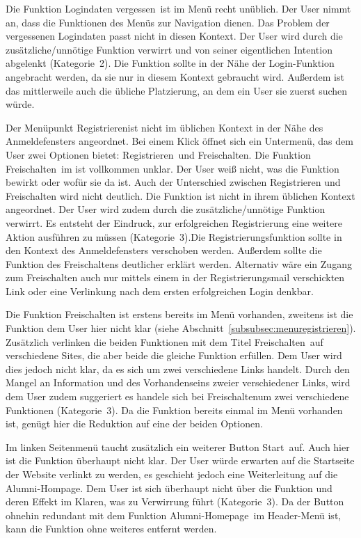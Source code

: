 {Die Funktion \glqq Logindaten vergessen\grqq~ist im Menü recht unüblich. Der User nimmt an, dass die Funktionen des Menüs zur Navigation dienen. Das Problem der vergessenen Logindaten passt nicht in diesen Kontext.
}
{Der User wird durch die zusätzliche/unnötige Funktion verwirrt und von seiner eigentlichen Intention abgelenkt (Kategorie~2).
}
{Die Funktion sollte in der Nähe der Login-Funktion angebracht werden, da sie nur in diesem Kontext gebraucht wird. Außerdem ist das mittlerweile auch die übliche Platzierung, an dem ein User sie zuerst suchen würde.
}

{Der Menüpunkt \glqq Registrieren\grqq ist nicht im üblichen Kontext in der Nähe des Anmeldefensters angeordnet. Bei einem Klick öffnet sich ein Untermenü, das dem User zwei Optionen bietet: \glqq Registrieren\grqq~und \glqq Freischalten\grqq.
Die Funktion \glqq Freischalten\grqq~im ist vollkommen unklar. Der User weiß nicht, was die Funktion bewirkt oder wofür sie da ist. Auch der Unterschied zwischen Registrieren und Freischalten wird nicht deutlich.
}{Die Funktion ist nicht in ihrem üblichen Kontext angeordnet. Der User wird zudem durch die zusätzliche/unnötige Funktion verwirrt. Es entsteht der Eindruck, zur erfolgreichen Registrierung eine weitere Aktion ausführen zu müssen (Kategorie~3).}{Die Registrierungsfunktion sollte in den Kontext des Anmeldefensters verschoben werden. Außerdem sollte die Funktion des Freischaltens deutlicher erklärt werden. Alternativ wäre ein Zugang zum Freischalten auch nur mittels einem in der Registrierungsmail verschickten Link oder eine Verlinkung nach dem ersten erfolgreichen Login denkbar.
}

{Die Funktion Freischalten ist erstens bereits im Menü vorhanden, zweitens ist die Funktion dem User hier nicht klar (siehe Abschnitt~\ref{subsubsec:menuregistrieren}). 
Zusätzlich verlinken die beiden Funktionen mit dem Titel \glqq Freischalten\grqq~auf verschiedene Sites, die aber beide die gleiche Funktion erfüllen. Dem User wird dies jedoch nicht klar, da es sich um zwei verschiedene Links handelt.
}
{Durch den Mangel an Information und des Vorhandenseins zweier verschiedener Links, wird dem User zudem suggeriert es handele sich bei \glqq Freischalten\grqq um zwei verschiedene Funktionen (Kategorie~3).
}
{
Da die Funktion bereits einmal im Menü vorhanden ist, genügt hier die Reduktion auf eine der beiden Optionen.
}

{Im linken Seitenmenü taucht zusätzlich ein weiterer Button \glqq Start\grqq~auf. Auch hier ist die Funktion überhaupt nicht klar. Der User würde erwarten auf die Startseite der Website verlinkt zu werden, es geschieht jedoch eine Weiterleitung auf die Alumni-Hompage. 
}
{Dem User ist sich überhaupt nicht über die Funktion und deren Effekt im Klaren, was zu Verwirrung führt (Kategorie~3).
}
{Da der Button ohnehin redundant mit dem Funktion \glqq Alumni-Homepage\grqq~im Header-Menü ist, kann die Funktion ohne weiteres entfernt werden.
}

